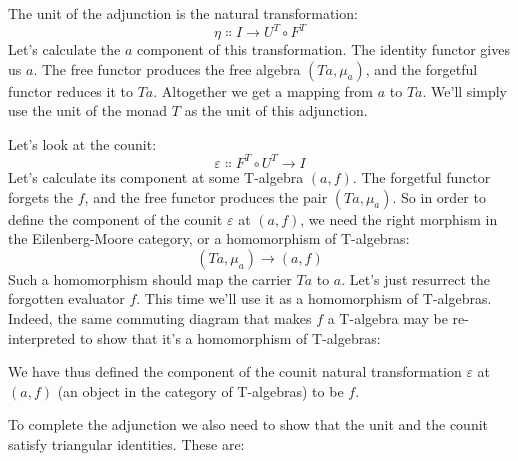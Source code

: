 The unit of the adjunction is the natural transformation:
\[\eta \Colon I \to U^T \circ F^T\]
Let's calculate the $a$ component of this transformation. The
identity functor gives us $a$. The free functor produces the free
algebra $(T a, \mu_a)$, and the forgetful functor reduces it to
$T a$. Altogether we get a mapping from $a$ to
$T a$. We'll simply use the unit of the monad $T$ as the
unit of this adjunction.

Let's look at the counit:
\[\varepsilon \Colon F^T \circ U^T \to I\]
Let's calculate its component at some T-algebra $(a, f)$. The
forgetful functor forgets the $f$, and the free functor produces
the pair $(T a, \mu_a)$. So in order to define the component of
the counit $\varepsilon$ at $(a, f)$, we need the right morphism in
the Eilenberg-Moore category, or a homomorphism of T-algebras:
\[(T a, \mu_a) \to (a, f)\]
Such a homomorphism should map the carrier $T a$ to $a$.
Let's just resurrect the forgotten evaluator $f$. This time we'll
use it as a homomorphism of T-algebras. Indeed, the same commuting
diagram that makes $f$ a T-algebra may be re-interpreted to show
that it's a homomorphism of T-algebras:

\begin{figure}[H]
  \centering
\end{figure}

\noindent
We have thus defined the component of the counit natural transformation
$\varepsilon$ at $(a, f)$ (an object in the category of T-algebras)
to be $f$.

To complete the adjunction we also need to show that the unit and the
counit satisfy triangular identities. These are:

\begin{figure}[H]
  \centering
  \begin{subfigure}
    \centering
  \end{subfigure}%
  \hspace{1cm}
  \begin{subfigure}
    \centering
  \end{subfigure}
\end{figure}

